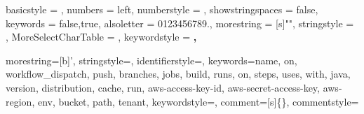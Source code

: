\newif\ifcolonfoundonthisline

\makeatletter

{
    basicstyle          = \footnotesize\ttfamily,
    numbers             = left,
    numberstyle         = \scriptsize,
    showstringspaces    = false,
    keywords            = {false,true},
    alsoletter          = 0123456789.,
    morestring          = [s]{"}{"},
    stringstyle         = \ifcolonfoundonthisline\JSONstringvaluestyle\fi,
    MoreSelectCharTable = \colon@json{\processColon@json},
    keywordstyle        = \ttfamily\bfseries,
}

\newcommand\processColon@json{%
    \colon@json%
    \ifnum\lst@mode=\lst@Pmode%
    \global\colonfoundonthislinetrue%
    \fi
}

\lst@AddToHook{Output}{%
    \ifcolonfoundonthisline%
    \ifnum\lst@mode=\lst@Pmode%
    \def\lst@thestyle{\JSONnumbervaluestyle}%
    \fi
    \fi
    \lsthk@DetectKeywords%
}

%
{\global\colonfoundonthislinefalse}

{
    morestring=[b]',
    stringstyle=\color{dkgreen},
    identifierstyle=\color{black},
    keywords={name, on, workflow\_dispatch, push, branches,
        jobs, build, runs, on, steps, uses, with, java, version,
        distribution, cache, run, aws-access-key-id, aws-secret-access-key,
        aws-region, env, bucket, path, tenant},
    keywordstyle=\color{blue},
    comment=[s]{\{}{\}},
    commentstyle=\color{black}
}

